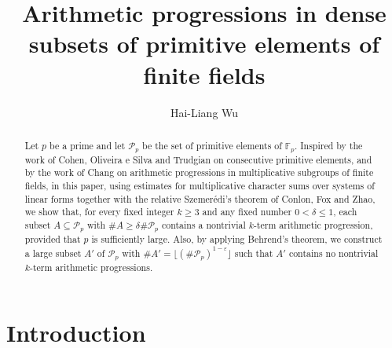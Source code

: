 \documentclass[12pt]{amsart}
\theoremstyle{plain}
\theoremstyle{remark}
\begin{document}
	
	\title[Arithmetic progressions in dense subsets of primitive elements of finite fields]
	{Arithmetic progressions in dense subsets of primitive elements of finite fields}
	\author[H.-L. Wu]{Hai-Liang Wu}
	
	\address {(Hai-Liang Wu) School of Science, Nanjing University of Posts and Telecommunications, Nanjing 210023, People's Republic of China}
	
	
	
	
	
	
	\begin{abstract}
	Let $p$ be a prime and let $\mathcal{P}_p$ be the set of primitive elements of $\mathbb{F}_p$. Inspired by the work of Cohen, Oliveira e Silva and Trudgian on consecutive primitive elements, and by the work of Chang on arithmetic progressions in multiplicative subgroups of finite fields, in this paper, using estimates for multiplicative character sums over systems of linear forms together with the relative Szemer\'edi's theorem of Conlon, Fox and Zhao, we show that, for every fixed integer $k\ge3$ and any fixed number $0<\delta\le 1$, each subset $A\subseteq\mathcal{P}_p$ with $\#A\ge\delta\#\mathcal{P}_p$ contains a nontrivial $k$-term arithmetic progression, provided that $p$ is sufficiently large. Also, by applying Behrend's theorem, we construct a large subset $A'$ of $\mathcal{P}_p$ with $\#A'=\lfloor(\#\mathcal{P}_p)^{1-\varepsilon}\rfloor$ such that $A'$ contains no nontrivial $k$-term arithmetic progressions. 
	\end{abstract}
	\maketitle
	
	
	
	
	\section{Introduction}
	\setcounter{lemma}{0}
	\setcounter{theorem}{0}
	\setcounter{equation}{0}
	\setcounter{conjecture}{0}
	\setcounter{remark}{0}
	\setcounter{corollary}{0}
	
\end{document}
